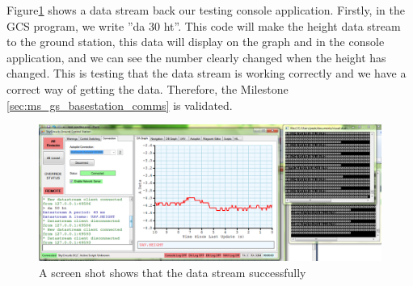 Figure\ref{test screenshot} shows a data stream back our testing console application.
Firstly, in the GCS program, we write ''da 30 ht''. 
This code will make the height data stream to the ground station, this data will display on the graph and in the console application, and we can see the number clearly changed when the height has changed.
This is testing that the data stream is working correctly and we have a correct way of getting the data.
Therefore, the Milestone \ref{sec:ms_gs_basestation_comms} is validated.
\begin{figure}[H]
\begin{center}
\includegraphics[width=1.00\textwidth]{testing_screenshots/test_data.png} 
\end{center}
\caption{A screen shot shows that the data stream successfully\label{test screenshot}}
\end{figure}
